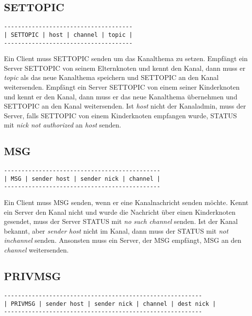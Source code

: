\documentclass{article}
\begin{document}
\subsection{SETTOPIC}

\begin{lstlisting}
-------------------------------------
| SETTOPIC | host | channel | topic |
-------------------------------------
\end{lstlisting}

Ein Client muss SETTOPIC senden um das Kanalthema zu setzen.
Empfängt ein Server SETTOPIC von seinem Elternknoten und kennt den Kanal, dann muss er \emph{topic} als das neue Kanalthema speichern und SETTOPIC an den Kanal weitersenden.
Empfängt ein Server SETTOPIC von einem seiner Kinderknoten und kennt er den Kanal, dann muss er das neue Kanalthema übernehmen und SETTOPIC an den Kanal weitersenden.
Ist \emph{host} nicht der Kanaladmin, muss der Server, falls SETTOPIC von einem Kinderknoten empfangen wurde, STATUS mit \emph{nick not authorized} an \emph{host} senden.

\subsection{MSG}

\begin{lstlisting}
---------------------------------------------
| MSG | sender host | sender nick | channel |
---------------------------------------------
\end{lstlisting}

Ein Client muss MSG senden, wenn er eine Kanalnachricht senden möchte.
Kennt ein Server den Kanal nicht und wurde die Nachricht über einen Kinderknoten gesendet, muss der Server STATUS mit \emph{no such channel} senden.
Ist der Kanal bekannt, aber \emph{sender host} nicht im Kanal, dann muss der STATUS mit \emph{not inchannel} senden.
Ansonsten muss ein Server, der MSG empfängt, MSG an den \emph{channel} weitersenden.

\subsection{PRIVMSG}

\begin{lstlisting}
---------------------------------------------------------
| PRIVMSG | sender host | sender nick | channel | dest nick |
---------------------------------------------------------
\end{lstlisting}
\end{document}
